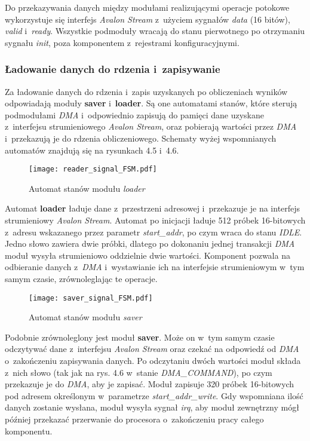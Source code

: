 Do przekazywania danych między modułami realizującymi operacje potokowe wykorzystuje się interfejs \textit{Avalon Stream} z~użyciem sygnałów \textit{data} (16 bitów), \textit{valid} i~\textit{ready}. Wszystkie podmoduły wracają do stanu pierwotnego po otrzymaniu sygnału \textit{init}, poza komponentem z~rejestrami konfiguracyjnymi.


\subsubsection{Ładowanie danych do rdzenia i~zapisywanie}

Za ładowanie danych do rdzenia i~zapis uzyskanych po obliczeniach wyników odpowiadają moduły \textbf{saver} i~\textbf{loader}. Są one automatami stanów, które sterują podmodułami \textit{DMA} i~odpowiednio zapisują do pamięci dane uzyskane z~interfejsu strumieniowego \textit{Avalon Stream}, oraz pobierają wartości przez \textit{DMA} i~przekazują je do rdzenia obliczeniowego. Schematy wyżej wspomnianych automatów znajdują się na rysunkach 4.5 i~4.6.

\begin{figure}[h]
	\centering
	\texttt{[image: reader\_signal\_FSM.pdf]}
	\caption{Automat stanów modułu \textit{loader}}
\end{figure}
\FloatBarrier %

Automat \textbf{loader} ładuje dane z~przestrzeni adresowej i~przekazuje je na interfejs strumieniowy \textit{Avalon Stream}. Automat po inicjacji ładuje 512 próbek 16-bitowych z~adresu wskazanego przez parametr \textit{start\_addr}, po czym wraca do stanu \textit{IDLE}. Jedno słowo zawiera dwie próbki, dlatego po dokonaniu jednej transakcji \textit{DMA} moduł wysyła strumieniowo oddzielnie dwie wartości. Komponent pozwala na odbieranie danych z~\textit{DMA} i~wystawianie ich na interfejsie strumieniowym w~tym samym czasie, zrównoleglając te operacje.

\begin{figure}[h]
	\centering
	\texttt{[image: saver\_signal\_FSM.pdf]}
	\caption{Automat stanów modułu \textit{saver}}
\end{figure}
\FloatBarrier %

Podobnie zrównoleglony jest moduł \textbf{saver}. Może on w~tym samym czasie odczytywać dane z~interfejsu \textit{Avalon Stream} oraz czekać na odpowiedź od \textit{DMA} o~zakończeniu zapisywania danych. Po odczytaniu dwóch wartości moduł składa z~nich słowo (tak jak na rys. 4.6 w~stanie \textit{DMA\_COMMAND}), po czym przekazuje je do \textit{DMA}, aby je zapisać. Moduł zapisuje 320 próbek 16-bitowych pod adresem określonym w~parametrze \textit{start\_addr\_write}. Gdy wspomniana ilość danych zostanie wysłana, moduł wysyła sygnał \textit{irq}, aby moduł zewnętrzny mógł później przekazać przerwanie do procesora o~zakończeniu pracy całego komponentu.


